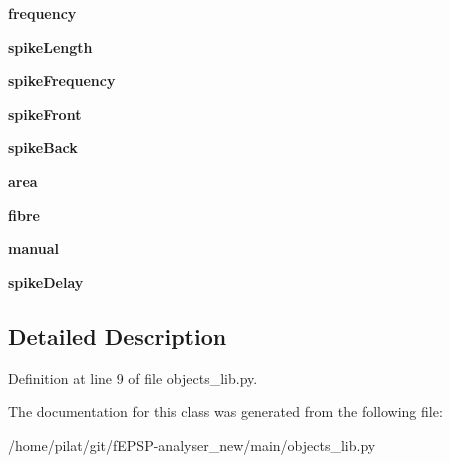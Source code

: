 \begin{DoxyCompactItemize}
\item 
\hypertarget{classmain_1_1objects__lib_1_1_spike_a09c9c562b159df3d0ceb13f9b142181e}{{\bfseries frequency}}\label{classmain_1_1objects__lib_1_1_spike_a09c9c562b159df3d0ceb13f9b142181e}

\item 
\hypertarget{classmain_1_1objects__lib_1_1_spike_a3d57385e2b11d90fd6a695cd8dbb1677}{{\bfseries spike\-Length}}\label{classmain_1_1objects__lib_1_1_spike_a3d57385e2b11d90fd6a695cd8dbb1677}

\item 
\hypertarget{classmain_1_1objects__lib_1_1_spike_a983ccac2ae11a2183a15454af69e2d3e}{{\bfseries spike\-Frequency}}\label{classmain_1_1objects__lib_1_1_spike_a983ccac2ae11a2183a15454af69e2d3e}

\item 
\hypertarget{classmain_1_1objects__lib_1_1_spike_aadd26806bec52b1c2e02c692d3e91c8b}{{\bfseries spike\-Front}}\label{classmain_1_1objects__lib_1_1_spike_aadd26806bec52b1c2e02c692d3e91c8b}

\item 
\hypertarget{classmain_1_1objects__lib_1_1_spike_afaebdfae2f1b2b6cb6d4a62bd80e71dc}{{\bfseries spike\-Back}}\label{classmain_1_1objects__lib_1_1_spike_afaebdfae2f1b2b6cb6d4a62bd80e71dc}

\item 
\hypertarget{classmain_1_1objects__lib_1_1_spike_ab2a9e98bbc1d75d3bb3b6a51163ac3a0}{{\bfseries area}}\label{classmain_1_1objects__lib_1_1_spike_ab2a9e98bbc1d75d3bb3b6a51163ac3a0}

\item 
\hypertarget{classmain_1_1objects__lib_1_1_spike_a3fc22aa18afca14b858789e016902e25}{{\bfseries fibre}}\label{classmain_1_1objects__lib_1_1_spike_a3fc22aa18afca14b858789e016902e25}

\item 
\hypertarget{classmain_1_1objects__lib_1_1_spike_a32fbff292f206f38ed15497a9174367e}{{\bfseries manual}}\label{classmain_1_1objects__lib_1_1_spike_a32fbff292f206f38ed15497a9174367e}

\item 
\hypertarget{classmain_1_1objects__lib_1_1_spike_a12adbb3297e0240f54ddb6e6fe8dca5a}{{\bfseries spike\-Delay}}\label{classmain_1_1objects__lib_1_1_spike_a12adbb3297e0240f54ddb6e6fe8dca5a}

\end{DoxyCompactItemize}


\subsection{Detailed Description}


Definition at line 9 of file objects\-\_\-lib.\-py.



The documentation for this class was generated from the following file\-:\begin{DoxyCompactItemize}
\item 
/home/pilat/git/f\-E\-P\-S\-P-\/analyser\-\_\-new/main/objects\-\_\-lib.\-py\end{DoxyCompactItemize}
